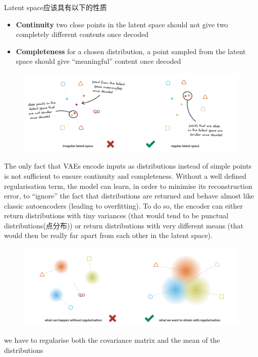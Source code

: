 Latent space应该具有以下的性质
\begin{itemize}
    \item \textbf{Continuity} two close points in the latent space should not give two completely different contents once decoded
    \item \textbf{Completeness} for a chosen distribution, a point sampled from the latent space should give “meaningful” content once decoded
\end{itemize}
\begin{figure}[H]
    \centering
    \includegraphics[width=16cm]{images/irregular_latent_space.png}
    \label{fig:irregular_latent_space}
\end{figure}
The only fact that VAEs encode inputs as distributions instead of simple points is
not sufficient to ensure continuity and completeness. Without a well defined
regularisation term, the model can learn, in order to minimise its reconstruction
error, to “ignore” the fact that distributions are returned and behave almost like
classic autoencoders (leading to overfitting). To do so, the encoder can either return
distributions with tiny variances (that would tend to be punctual distributions(点分布)) or return
distributions with very different means (that would then be really far apart from each other
in the latent space).
\begin{figure}[H]
    \centering
    \includegraphics[width=16cm]{images/regularised_distributions_vae.png}
    \label{fig:regularised_distributions_vae}
\end{figure}
we have to regularise both the covariance matrix and the mean of the distributions
